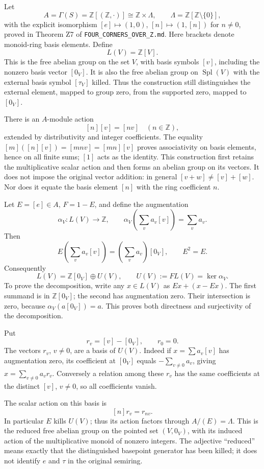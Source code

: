 \documentclass[
]{article}
\begin{document}
Let \[
A=\Gamma(S)=\mathbb Z[(\mathbb Z,\cdot)]
\cong\mathbb Z\times\Lambda,
\qquad
\Lambda=\mathbb Z[\mathbb Z\setminus\{0\}],
\tag{Q8}
\] with the explicit isomorphism \([e]\mapsto(1,0)\),
\([n]\mapsto(1,[n])\) for \(n\ne0\), proved in Theorem Z7 of
\texttt{FOUR\_CORNERS\_OVER\_Z.md}. Here brackets denote monoid-ring
basis elements. Define \[
L(V)=\mathbb Z[V].
\tag{Q9}
\] This is the free abelian group on the set \(V\), with basis symbols
\([v]\), including the nonzero basis vector \([0_V]\). It is also the
free abelian group on \(\operatorname{Spl}(V)\) with the external basis
symbol \([\tau_V]\) killed. Thus the construction still distinguishes
the external element, mapped to group zero, from the supported zero,
mapped to \([0_V]\).

There is an \(A\)-module action \[
[n][v]=[nv]\quad(n\in\mathbb Z),
\tag{Q10}
\] extended by distributivity and integer coefficients. The equality
\([m]([n][v])=[mnv]=[mn][v]\) proves associativity on basis elements,
hence on all finite sums; \([1]\) acts as the identity. This
construction first retains the multiplicative scalar action and then
forms an abelian group on its vectors. It does not impose the original
vector addition: in general \([v+w]\ne[v]+[w]\). Nor does it equate the
basis element \([n]\) with the ring coefficient \(n\).

Let \(E=[e]\in A\), \(F=1-E\), and define the augmentation \[
\alpha_V:L(V)\to\mathbb Z,
\qquad\alpha_V\left(\sum_v a_v[v]\right)=\sum_v a_v.
\tag{Q11}
\] Then \[
E\left(\sum_v a_v[v]\right)
=\left(\sum_v a_v\right)[0_V],
\qquad E^2=E.
\tag{Q12}
\] Consequently \[
L(V)=\mathbb Z[0_V]\oplus U(V),
\qquad U(V):=FL(V)=\ker\alpha_V.
\tag{Q13}
\] To prove the decomposition, write any \(x\in L(V)\) as \(Ex+(x-Ex)\).
The first summand is in \(\mathbb Z[0_V]\); the second has augmentation
zero. Their intersection is zero, because \(\alpha_V(a[0_V])=a\). This
proves both directness and surjectivity of the decomposition.

Put \[
r_v=[v]-[0_V],\qquad r_0=0.
\tag{Q14}
\] The vectors \(r_v\), \(v\ne0\), are a basis of \(U(V)\). Indeed if
\(x=\sum a_v[v]\) has augmentation zero, its coefficient at \([0_V]\)
equals \(-\sum_{v\ne0}a_v\), giving \(x=\sum_{v\ne0}a_vr_v\). Conversely
a relation among these \(r_v\) has the same coefficients at the distinct
\([v]\), \(v\ne0\), so all coefficients vanish.

The scalar action on this basis is \[
[n]r_v=r_{nv}.
\tag{Q15}
\] In particular \(E\) kills \(U(V)\); thus its action factors through
\(A/(E)=\Lambda\). This is the reduced free abelian group on the pointed
set \((V,0_V)\), with its induced action of the multiplicative monoid of
nonzero integers. The adjective ``reduced'' means exactly that the
distinguished basepoint generator has been killed; it does not identify
\(e\) and \(\tau\) in the original semiring.
\end{document}
